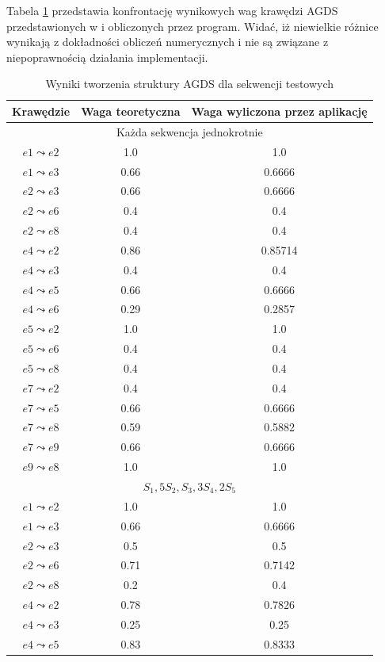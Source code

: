 Tabela \ref{tab:test} przedstawia konfrontację wynikowych wag krawędzi AGDS przedstawionych w \cite[s. 232]{Horzyk} i obliczonych przez program.
Widać, iż niewielkie różnice wynikają z dokładności obliczeń numerycznych i nie są związane z niepoprawnością działania implementacji.
\begin{table}[!h]
\centering
\caption{Wyniki tworzenia struktury AGDS dla sekwencji testowych}
\label{tab:test}
\begin{tabular}{ccc}
\hline
Krawędzie  & Waga teoretyczna & Waga wyliczona przez aplikację\\
\hline
\multicolumn{3}{c}{Każda sekwencja jednokrotnie}\\
\hline
$e1 \leadsto e2$ & 1.0  & 1.0\\
$e1 \leadsto e3$ & 0.66  & 0.6666\\
$e2 \leadsto e3$ & 0.66  & 0.6666\\
$e2 \leadsto e6$ & 0.4  & 0.4\\
$e2 \leadsto e8$ & 0.4  & 0.4\\
$e4 \leadsto e2$ & 0.86  & 0.85714\\
$e4 \leadsto e3$ & 0.4  & 0.4\\
$e4 \leadsto e5$ & 0.66  & 0.6666\\
$e4 \leadsto e6$ & 0.29  & 0.2857\\
$e5 \leadsto e2$ & 1.0  & 1.0\\
$e5 \leadsto e6$ & 0.4  & 0.4\\
$e5 \leadsto e8$ & 0.4  & 0.4\\
$e7 \leadsto e2$ & 0.4  & 0.4\\ 
$e7 \leadsto e5$ & 0.66  & 0.6666\\
$e7 \leadsto e8$ & 0.59  & 0.5882\\
$e7 \leadsto e9$ & 0.66  & 0.6666\\
$e9 \leadsto e8$ & 1.0  & 1.0\\
\hline
\multicolumn{3}{c}{$S_1, 5 S_2, S_3, 3 S_4, 2 S_5$}\\
\hline
$e1 \leadsto e2$ & 1.0  & 1.0\\
$e1 \leadsto e3$ & 0.66  & 0.6666\\
$e2 \leadsto e3$ & 0.5  & 0.5\\
$e2 \leadsto e6$ & 0.71  & 0.7142\\
$e2 \leadsto e8$ & 0.2  & 0.4\\
$e4 \leadsto e2$ & 0.78  & 0.7826\\
$e4 \leadsto e3$ & 0.25  & 0.25\\
$e4 \leadsto e5$ & 0.83 & 0.8333\\

\end{tabular}
\end{table}
